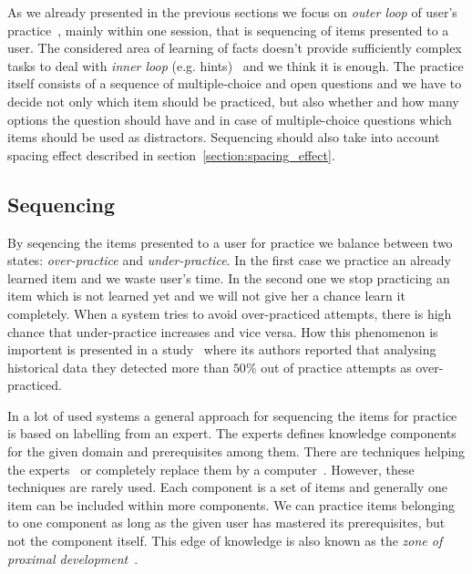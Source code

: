 \documentclass[table,color]{fithesis3/fithesis3}
\begin{document}
As we already presented in the previous sections we focus on \emph{outer loop}
of user's practice~\cite{vanlehn2006behavior}, mainly within one session, that
is sequencing of items presented to a user. The considered area of learning
of facts doesn't provide sufficiently complex tasks to deal with \emph{inner
loop} (e.g. hints)~\cite{vanlehn2006behavior} and we think it is enough. The
practice itself consists of a sequence of multiple-choice and open
questions and we have to decide not only which item should be practiced, but
also whether and how many options the question should have and in case of
multiple-choice questions which items should be used as distractors. Sequencing
should also take into account spacing effect described in
section~\ref{section:spacing_effect}.

\subsection{Sequencing}

By seqencing the items presented to a user for practice we balance between two
states: \emph{over-practice} and \emph{under-practice}. In the first case we
practice an already learned item and we waste user's time. In the second one we
stop practicing an item which is not learned yet and we will not give her a
chance learn it completely. When a system tries to avoid over-practiced
attempts, there is high chance that under-practice increases and vice versa.
How this phenomenon is importent is presented in a study~\cite{cen2007over}
where its authors reported that analysing historical data they detected more
than $50\%$ out of practice attempts as over-practiced.

In a lot of used systems a general approach for sequencing the items for
practice is based on labelling from an expert. The experts defines knowledge
components for the given domain and prerequisites among them. There are
techniques helping the ex\-perts~\cite{niznan2014using} or completely replace
them by a computer~\cite{boros2013automatic}. However, these techniques are
rarely used. Each component is a set of items and generally one item can be
included within more components. We can practice items belonging to one
component as long as the given user has mastered its prerequisites, but not the
component itself. This edge of knowledge is also known as the \emph{zone of
proximal development}~\cite{lee2005signifying}.
\end{document}
